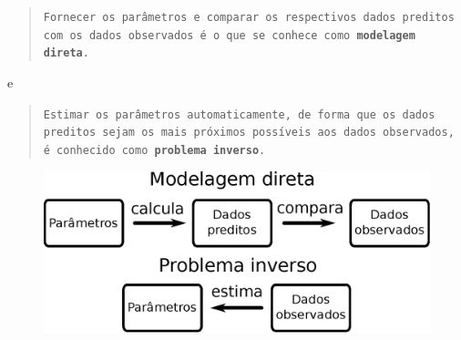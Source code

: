 \begin{quotation}
{\tt Fornecer os parâmetros e comparar os respectivos dados pre\-di\-tos com os dados
observados é o que se conhece como {\bf mo\-de\-la\-gem direta}.}
\end{quotation}

e

\begin{quotation}
{\tt Estimar os parâmetros automaticamente, de forma que os dados preditos sejam os
mais próximos possíveis aos dados observados, é conhecido como {\bf problema inverso}.}
\end{quotation}

\begin{figure}[!htb]
    \centering
    \includegraphics[scale=0.8]{../figs/setinhas.eps}
    \caption{}
    \label{setinhas}
\end{figure}
